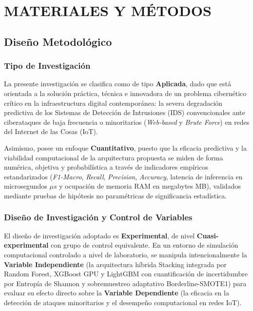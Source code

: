 \chapter{MATERIALES Y MÉTODOS}

\section{Diseño Metodológico}

\subsection{Tipo de Investigación}
La presente investigación se clasifica como de tipo \textbf{Aplicada}, dado que está orientada a la solución práctica, técnica e innovadora de un problema cibernético crítico en la infraestructura digital contemporánea: la severa degradación predictiva de los Sistemas de Detección de Intrusiones (IDS) convencionales ante ciberataques de baja frecuencia o minoritarios (\textit{Web-based} y \textit{Brute Force}) en redes del Internet de las Cosas (IoT).

Asimismo, posee un enfoque \textbf{Cuantitativo}, puesto que la eficacia predictiva y la viabilidad computacional de la arquitectura propuesta se miden de forma numérica, objetiva y probabilística a través de indicadores empíricos estandarizados (\textit{F1-Macro}, \textit{Recall}, \textit{Precision}, \textit{Accuracy}, latencia de inferencia en microsegundos $\mu s$ y ocupación de memoria RAM en megabytes MB), validados mediante pruebas de hipótesis no paramétricas de significancia estadística.

\subsection{Diseño de Investigación y Control de Variables}
El diseño de investigación adoptado es \textbf{Experimental}, de nivel \textbf{Cuasi-experimental} con grupo de control equivalente. En un entorno de simulación computacional controlado a nivel de laboratorio, se manipula intencionalmente la \textbf{Variable Independiente} (la arquitectura híbrida Stacking integrada por Random Forest, XGBoost GPU y LightGBM con cuantificación de incertidumbre por Entropía de Shannon y sobremuestreo adaptativo Borderline-SMOTE1) para evaluar su efecto directo sobre la \textbf{Variable Dependiente} (la eficacia en la detección de ataques minoritarios y el desempeño computacional en redes IoT).

